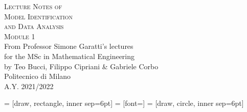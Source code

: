 \documentclass[10pt,a4paper,oneside,openright]{book}
\begin{document}
\frontmatter

\pagestyle{empty}


\hypertarget{mytitlepage}{} %

\vspace*{\fill}
\begin{center}
	{\large \textsc{Lecture Notes of}}\\
	\vspace*{0.4cm}
	{\Huge \textsc{Model Identification}}\\
	\vspace*{0.4cm}
	{\Huge \textsc{and Data Analysis}}\\
	\vspace*{0.4cm}
	{\huge \textsc{Module 1}}\\
	\vspace*{1cm}
	{\large {From Professor Simone Garatti's lectures}}\\
	\vspace*{0.1cm}
	{\large for the MSc in Mathematical Engineering}\\
	\vspace*{0.4cm}
	{\large {by Teo Bucci, Filippo Cipriani \& Gabriele Corbo}}\\
	\vspace*{1cm}
	Politecnico di Milano\\A.Y. 2021/2022
\end{center}
\vspace*{\fill}
\clearpage


\hypertarget{mycopyright}{} %

\clearpage


\hypertarget{mypreface}{} %

\clearpage


\cleardoublepage
\pagestyle{toc}
\hypertarget{mytoc}{} %
\bookmark[dest=mytoc,level=chapter]{\contentsname} %
\tableofcontents
\cleardoublepage


\pagestyle{fancy}
\mainmatter

      = [draw, rectangle, inner sep=6pt]
 = [font=\small]
        = [draw, circle, inner sep=6pt]
\end{document}
